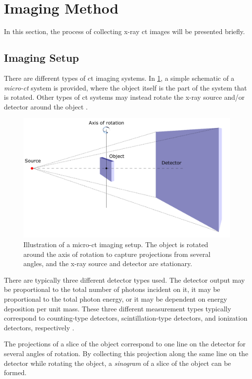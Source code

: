 \section{Imaging Method}
\label{sec:ct:imagingmethod}
In this section, the process of collecting x-ray \gls{ct} images will be presented briefly.

\subsection{Imaging Setup}
\label{sec:ct:imagingmethod:setup}
There are different types of \gls{ct} imaging systems. In \cref{fig:ctsetup}, a simple schematic of a \textit{micro-\gls{ct}} system is provided, where the object itself is the part of the system that is rotated. Other types of \gls{ct} systems may instead rotate the x-ray source and/or detector around the object \cite[126-129]{KakSlaney98}. 
\begin{figure}[htbp]  
    \centering
    \includegraphics[width=.9\textwidth]{figures/ctsetup.pdf}
    \caption[Illustration of a CT imaging setup]{Illustration of a micro-\gls{ct} imaging setup. The object is rotated around the axis of rotation to capture projections from several angles, and the x-ray source and detector are stationary. }
    \label{fig:ctsetup}
\end{figure}

There are typically three different detector types used. The detector output may be proportional to the total number of photons incident on it, it may be proportional to the total photon energy, or it may be dependent on energy deposition per unit mass. These three different measurement types typically correspond to counting-type detectors, scintillation-type detectors, and ionization detectors, respectively \cite[118]{KakSlaney98}. 

The projections of a slice of the object correspond to one line on the detector for several angles of rotation. By collecting this projection along the same line on the detector while rotating the object, a \textit{sinogram} of a slice of the object can be formed. 

